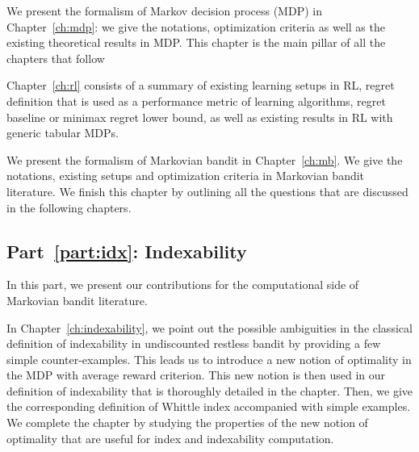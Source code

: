 We present the formalism of Markov decision process (MDP) in Chapter~\ref{ch:mdp}: we give the notations, optimization criteria as well as the existing theoretical results in MDP.
This chapter is the main pillar of all the chapters that follow

Chapter~\ref{ch:rl} consists of a summary of existing learning setups in RL, regret definition that is used as a performance metric of learning algorithms, regret baseline or minimax regret lower bound, as well as existing results in RL with generic tabular MDPs.

We present the formalism of Markovian bandit in Chapter~\ref{ch:mb}. We give the notations, existing setups and optimization criteria in Markovian bandit literature.
We finish this chapter by outlining all the questions that are discussed in the following chapters.

\subsection{Part~{\ref{part:idx}}: Indexability}

In this part, we present our contributions for the computational side of Markovian bandit literature.

In Chapter~\ref{ch:indexability}, we point out the possible ambiguities in the classical definition of indexability in undiscounted restless bandit by providing a few simple counter-examples.
This leads us to introduce a new notion of optimality in the MDP with average reward criterion.
This new notion is then used in our definition of indexability that is thoroughly detailed in the chapter.
Then, we give the corresponding definition of Whittle index accompanied with simple examples.
We complete the chapter by studying the properties of the new notion of optimality that are useful for index and indexability computation.

